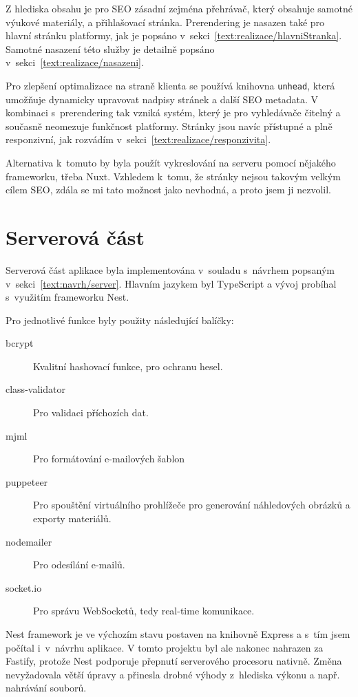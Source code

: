 Z hlediska obsahu je pro SEO zásadní zejména přehrávač, který obsahuje samotné výukové materiály, a přihlašovací stránka. 
Prerendering je nasazen také pro hlavní stránku platformy, jak je popsáno v~sekci~\ref{text:realizace/hlavniStranka}. 
Samotné nasazení této služby je detailně popsáno v~sekci~\ref{text:realizace/nasazeni}.

Pro zlepšení optimalizace na straně klienta se používá knihovna \texttt{unhead}, která umožňuje dynamicky upravovat nadpisy stránek a další SEO metadata. 
V kombinaci s~prerendering tak vzniká systém, který je pro vyhledávače čitelný a současně neomezuje funkčnost platformy. 
Stránky jsou navíc přístupné a plně responzivní, jak rozvádím v~sekci~\ref{text:realizace/responzivita}.

Alternativa k~tomuto by byla použít vykreslování na serveru pomocí nějakého frameworku, třeba Nuxt.
Vzhledem k~tomu, že stránky nejsou takovým velkým cílem SEO, zdála se mi tato možnost jako nevhodná, a proto jsem ji nezvolil.

\section{Serverová část}\label{text:realizace/server}

Serverová část aplikace byla implementována v~souladu s~návrhem popsaným v~sekci~\ref{text:navrh/server}. 
Hlavním jazykem byl TypeScript a vývoj probíhal s~využitím frameworku Nest. 

Pro jednotlivé funkce byly použity následující balíčky:

\begin{description}
    \item[bcrypt] Kvalitní hashovací funkce, pro ochranu hesel.
    \item[class-validator] Pro validaci příchozích dat.
    \item[mjml] Pro formátování e-mailových šablon
    \item[puppeteer] Pro spouštění virtuálního prohlížeče pro generování náhledových obrázků a exporty materiálů.
    \item[nodemailer] Pro odesílání e-mailů.
    \item[socket.io] Pro správu WebSocketů, tedy real-time komunikace.
\end{description}

Nest framework je ve výchozím stavu postaven na knihovně Express a s~tím jsem počítal i~v~návrhu aplikace.
V tomto projektu byl ale nakonec nahrazen za Fastify, protože Nest podporuje přepnutí serverového procesoru nativně. 
Změna nevyžadovala větší úpravy a přinesla drobné výhody z~hlediska výkonu a např. nahrávání souborů.

